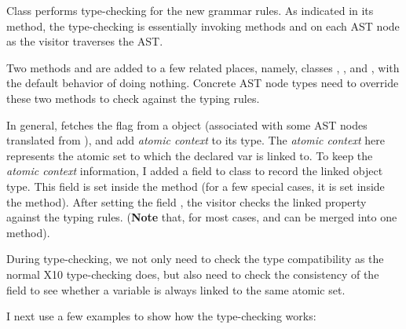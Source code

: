 \documentclass{article}
\begin{document}
Class  performs type-checking for the new grammar rules. As indicated in its  method, the type-checking is essentially invoking methods  and  on each AST node as the visitor traverses the AST.

Two methods   and  are added to a few related places, namely, classes , , and , with the default behavior of  doing nothing.  Concrete AST node types need to override these two methods to check against the typing rules.

In general,   fetches the  flag from a  object (associated with some AST nodes translated from ), and add \textit{atomic context} to its type. The \textit{atomic context} here represents the atomic set to which the declared var is linked to.  To keep the \textit{atomic context} information,  I added a  field   to class  to record the linked object type. This field is set inside the  method (for a few special cases, it is set inside the  method). After setting the field , the visitor checks the linked property against the typing rules. (\textbf{Note} that, for most cases,  and  can be merged into one method).

During type-checking, we not only need to check the type compatibility as the normal X10 type-checking does, but also need to check the consistency of the  field to see whether a variable is always linked to the same atomic set.

I next use a few examples to show how the type-checking works:
\end{document}
